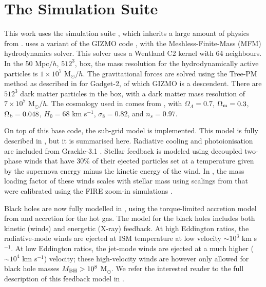\section{The \simba{} Simulation Suite}
\label{sec:simba}

This work uses the \simba{} simulation suite \citep{dave2018}, which inherits a
large amount of physics from \mufasa{} \citep{dave2016}. \simba{} uses a
variant of the GIZMO code \citep{hopkins2015}, with the Meshless-Finite-Mass
(MFM) hydrodynamics solver. This solver uses a Wentland C2 kernel with 64
neighbours. In the 50 Mpc$/h$, $512^3$, box, the mass resolution for the
hydrodynamically active particles is $1\times10^7$ M$_\odot/h$. The
gravitational forces are solved using the Tree-PM method as described in
\citet{Springel2005} for Gadget-2, of which GIZMO is a descendent. There are
$512^3$ dark matter particles in the box, with a dark matter mass resolution of
$7\times10^7$ M$_\odot/h$. The cosmology used in \simba{} comes from
\citet{PlanckCollaboration2016}, with $\Omega_\Lambda = 0.7$, $\Omega_{\rm m} =
0.3$, $\Omega_{\rm b} = 0.048$, $H_0 = 68$ km s$^{-1}$, $\sigma_8=0.82$, and
$n_s=0.97$.

On top of this base code, the \simba{} sub-grid model is implemented. This
model is fully described in \citet{dave2018}, but it is summarised here.
Radiative cooling and photoionisation are included from Grackle-3.1
\citep{smith2016}. Stellar feedback is modeled using decoupled two-phase winds
that have 30\% of their ejected particles set at a temperature given by the
supernova energy minus the kinetic energy of the wind. In \simba{}, the mass
loading factor of these winds scales with stellar mass using scalings from
\citet{muratov2015} that were calibrated using the FIRE zoom-in simulations
\citep{fireproject2014}.

Black holes are now fully modelled in \simba{}, using the torque-limited
accretion model from \citet{anglesalcazar2017} and \citet{bondi1952} accretion
for the hot gas. The model for the black holes includes both kinetic (winds)
and energetic (X-ray) feedback. At high Eddington ratios, the radiative-mode
winds are ejected at ISM temperature at low velocity $\sim 10^3$ km s$^{-1}$.
At low Eddington ratios, the jet-mode winds are ejected at a much higher ($\sim
10^4$ km s$^{-1}$) velocity; these high-velocity winds are however only allowed
for black hole masses $M_{\rm BH} > 10^8$ M$_\odot$. We refer the interested
reader to the full description of this feedback model in \citet{dave2018}.

